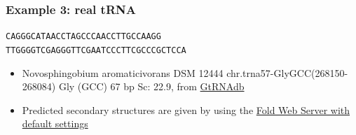 \documentclass[xcolor=table]{beamer}
\begin{document}
\begin{frame}[fragile] \frametitle{Example 3: real tRNA}
\centering
 \texttt{CAGGGCATAACCTAGCCCAACCTTGCCAAGG\\TTGGGGTCGAGGGTTCGAATCCCTTCGCCCGCTCCA}
\vspace{0.5cm}
\begin{itemize}
  \item Novosphingobium aromaticivorans DSM 12444 chr.trna57-GlyGCC(268150-268084) Gly (GCC) 67 bp Sc: 22.9, from \href{http://gtrnadb2009.ucsc.edu/download.html}{GtRNAdb}
  \item Predicted secondary structures are given by using the \href{http://rna.urmc.rochester.edu/RNAstructureWeb/Servers/Fold/Fold.html}{Fold Web Server with default settings}

\end{itemize}
\end{frame}
\end{document}
